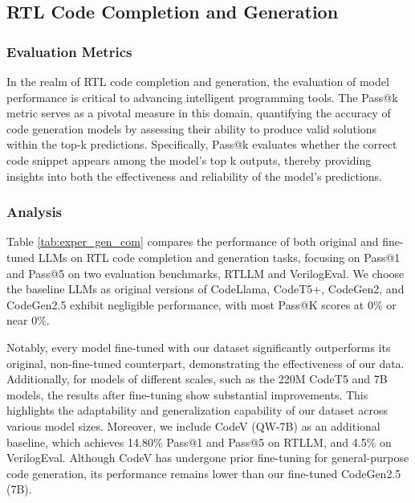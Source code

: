 \subsection{RTL Code Completion and Generation}
\label{sec:completion}






\subsubsection{Evaluation Metrics}
In the realm of RTL code completion and generation, the evaluation of model performance is critical to advancing intelligent programming tools. The Pass@k metric serves as a pivotal measure in this domain, quantifying the accuracy of code generation models by assessing their ability to produce valid solutions within the top-k predictions. Specifically, Pass@k evaluates whether the correct code snippet appears among the model's top k outputs, thereby providing insights into both the effectiveness and reliability of the model's predictions.





\subsubsection{Analysis}


Table \ref{tab:exper_gen_com} compares the performance of both original and fine-tuned LLMs on RTL code completion and generation tasks, focusing on Pass@1 and Pass@5 on two evaluation benchmarks, RTLLM\cite{lu2024rtllm} and VerilogEval\cite{liu2023verilogeval}. 
We choose the baseline LLMs as original versions of CodeLlama, CodeT5+, CodeGen2, and CodeGen2.5 exhibit negligible performance, with most Pass@K scores at 0\% or near 0\%.

Notably, every model fine-tuned with our dataset significantly outperforms its original, non-fine-tuned counterpart, demonstrating the effectiveness of our data. Additionally, for models of different scales, such as the 220M CodeT5 and 7B models, the results after fine-tuning show substantial improvements. This highlights the adaptability and generalization capability of our dataset across various model sizes. Moreover, we include CodeV (QW-7B) \cite{zhao2024codev} as an additional baseline, which achieves 14.80\% Pass@1 and Pass@5 on RTLLM, and 4.5\% on VerilogEval. Although CodeV has undergone prior fine-tuning for general-purpose code generation, its performance remains lower than our fine-tuned CodeGen2.5 (7B). 

